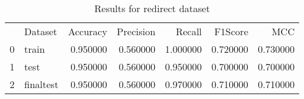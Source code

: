 \begin{table}
\caption{Results for redirect dataset}
\begin{tabular}{llrrrrr}
 & Dataset & Accuracy & Precision & Recall & F1Score & MCC \\
0 & train & 0.950000 & 0.560000 & 1.000000 & 0.720000 & 0.730000 \\
1 & test & 0.950000 & 0.560000 & 0.950000 & 0.700000 & 0.700000 \\
2 & finaltest & 0.950000 & 0.560000 & 0.970000 & 0.710000 & 0.710000 \\
\end{tabular}
\end{table}
